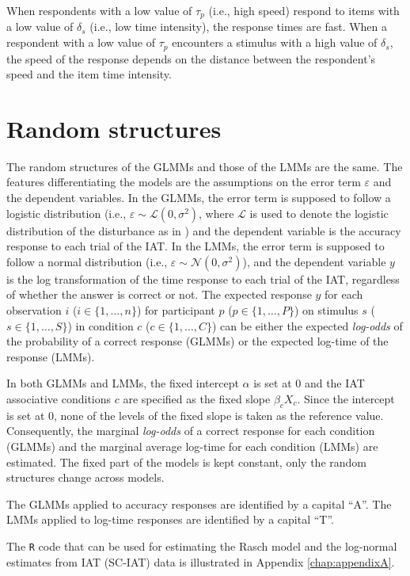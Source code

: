 \documentclass[12pt]{book}
\begin{document}
When respondents with a low value of $\tau_p$ (i.e., high speed) respond to items with a low value of $\delta_s$ (i.e., low time intensity), the response times are fast. 
When a respondent with a low value of $\tau_p$ encounters a stimulus with a high value of $\delta_s$, the speed of the response depends on the distance between the respondent's speed and the item time intensity.

\section{Random structures}\label{sec:random}
The random structures of the GLMMs and those of the LMMs are the same. The features differentiating the models are the assumptions on the error term $\varepsilon$ and the dependent variables. 
In the GLMMs, the error term is supposed to follow a logistic distribution (i.e., $\varepsilon \sim \mathcal{L}(0, \sigma^2)$, where $\mathcal{L}$ is used to denote the logistic distribution of the disturbance as in ) and the dependent variable is the accuracy response to each trial of the IAT. 
In the LMMs, the error term is supposed to follow a normal distribution (i.e., $\varepsilon \sim \mathcal{N}(0, \sigma^2)$), and the dependent variable $y$ is the log transformation of the time response to each trial of the IAT, regardless of whether the answer is correct or not.
The expected response $y$ for each observation $i$ ($i \in \{1, \ldots, n\}$)  for participant $p$ ($p \in \{1,\ldots, P\}$) on stimulus $s$ ($s \in \{1,\ldots, S\}$) in condition $c$ ($c\in \{1,\ldots, C\}$) can be either the expected \emph{log-odds} of the probability of a correct response (GLMMs) or the  expected log-time of the response (LMMs).

In both GLMMs and LMMs, the fixed intercept $\alpha$ is set at $0$ and the IAT associative conditions $c$ are specified as the fixed slope $\beta_cX_c$. Since the intercept is set at $0$, none of the levels of the fixed slope is taken as the reference value. Consequently, the marginal \emph{log-odds} of a correct response for each condition (GLMMs) and the marginal average log-time for each condition (LMMs) are estimated.
The fixed part of the models is kept constant, only the random structures change across models.

The GLMMs applied to accuracy responses are identified by a capital ``A''. The LMMs applied to log-time responses are identified by a capital ``T''. 

The \verb*|R| code that can be used for estimating the Rasch model and the log-normal estimates from IAT (SC-IAT) data is illustrated in Appendix \ref{chap:appendixA}.
\end{document}
